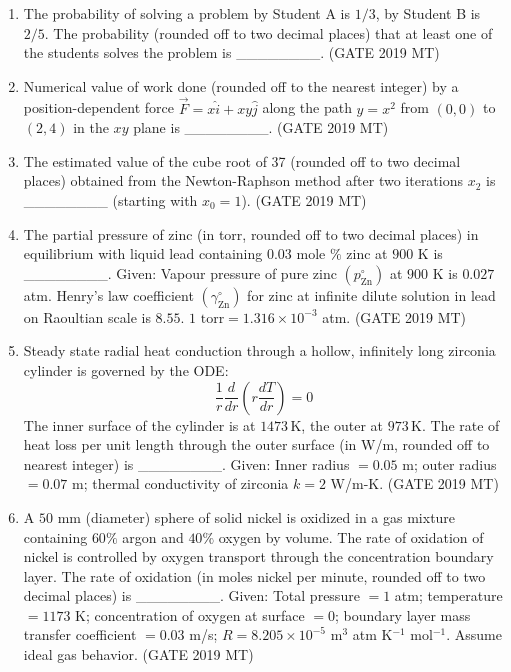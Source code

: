 \documentclass[12pt]{article}
\begin{document}
\begin{enumerate}
\item The probability of solving a problem by Student A is $1/3$, by Student B is $2/5$. The probability (rounded off to two decimal places) that at least one of the students solves the problem is ________. (GATE 2019 MT)

\item Numerical value of work done (rounded off to the nearest integer) by a position-dependent force $\vec{F} = x\hat{i} + xy\hat{j}$ along the path $y = x^2$ from $(0,0)$ to $(2,4)$ in the $xy$ plane is ________. (GATE 2019 MT)

\item The estimated value of the cube root of 37 (rounded off to two decimal places) obtained from the Newton-Raphson method after two iterations $x_2$ is ________ (starting with $x_0 = 1$). (GATE 2019 MT)

\item The partial pressure of zinc (in torr, rounded off to two decimal places) in equilibrium with liquid lead containing $0.03$ mole $\%$ zinc at $900$ K is ________.
Given: Vapour pressure of pure zinc $(p^\circ_\text{Zn})$ at $900$ K is $0.027$ atm. Henry’s law coefficient $(\gamma^\circ_\text{Zn})$ for zinc at infinite dilute solution in lead on Raoultian scale is $8.55$. $1\text{ torr} = 1.316\times 10^{-3}$ atm. (GATE 2019 MT)

\item Steady state radial heat conduction through a hollow, infinitely long zirconia cylinder is governed by the ODE: 
\[
\dfrac{1}{r}\dfrac{d}{dr}\left(r\dfrac{dT}{dr}\right)=0
\]
The inner surface of the cylinder is at $1473\,\text{K}$, the outer at $973\,\text{K}$. The rate of heat loss per unit length through the outer surface (in W/m, rounded off to nearest integer) is ________.
Given: Inner radius $= 0.05$ m; outer radius $= 0.07$ m; thermal conductivity of zirconia $k = 2$ W/m-K. (GATE 2019 MT)

\item A $50$ mm (diameter) sphere of solid nickel is oxidized in a gas mixture containing $60\%$ argon and $40\%$ oxygen by volume. The rate of oxidation of nickel is controlled by oxygen transport through the concentration boundary layer. The rate of oxidation (in moles nickel per minute, rounded off to two decimal places) is ________.
Given: Total pressure $= 1$ atm; temperature $= 1173$ K; concentration of oxygen at surface $= 0$; boundary layer mass transfer coefficient $= 0.03$ m/s; $R = 8.205 \times 10^{-5}$ m$^3$ atm K$^{-1}$ mol$^{-1}$. Assume ideal gas behavior. (GATE 2019 MT)


\end{enumerate}
\end{document}
